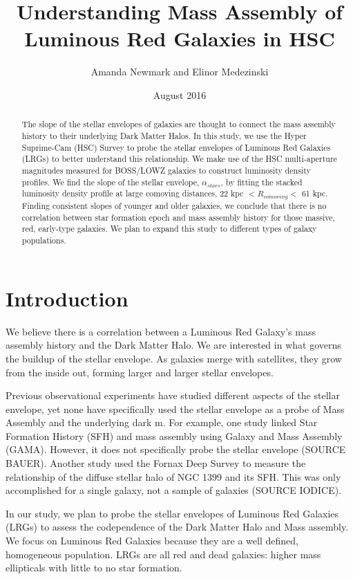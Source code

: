 \documentclass{article}
\title{Understanding Mass Assembly of Luminous Red Galaxies in HSC}
\author{Amanda Newmark and Elinor Medezinski}
\date{August 2016}
\begin{document}
\begin{titlepage}
\maketitle
\end{titlepage}

\begin{abstract}
The slope of the stellar envelopes of galaxies are thought to connect the mass assembly history to their underlying Dark Matter Halos. In this study, we use the Hyper Suprime-Cam (HSC) Survey to probe the stellar envelopes of Luminous Red Galaxies (LRGs) to better understand this relationship. We make use of the HSC multi-aperture magnitudes measured for BOSS/LOWZ galaxies to construct luminosity density profiles. We find the slope of the stellar envelope, $\alpha_{stars}$, by fitting the stacked luminosity density profile at large comoving distances, 22 kpc $< R_{comoving} <$ 61 kpc. Finding consistent slopes of younger and older galaxies, we conclude that there is no correlation between star formation epoch and mass assembly history for those massive, red, early-type galaxies. We plan to expand this study to different types of galaxy populations.
\end{abstract}
\tableofcontents{}

\clearpage
\section{Introduction}
We believe there is a correlation between a Luminous Red Galaxy's mass assembly history and the Dark Matter Halo. We are interested in what governs the buildup of the stellar envelope. As galaxies merge with satellites, they grow from the inside out, forming larger and larger stellar envelopes.

Previous observational experiments have studied different aspects of the stellar envelope, yet none have specifically used the stellar envelope as a probe of Mass Assembly and the underlying dark m. For example, one study linked Star Formation History (SFH) and mass assembly using Galaxy and Mass Assembly (GAMA). However, it does not specifically probe the stellar envelope (SOURCE BAUER). Another study used the Fornax Deep Survey to measure the relationship of the diffuse stellar halo of NGC 1399 and its SFH. This was only accomplished for a single galaxy, not a sample of galaxies (SOURCE IODICE).

In our study, we plan to probe the stellar envelopes of Luminous Red Galaxies (LRGs) to assess the codependence of the Dark Matter Halo and Mass assembly. We focus on Luminous Red Galaxies because they are a well defined, homogeneous population. LRGs are all red and dead galaxies: higher mass ellipticals with little to no star formation.
\end{document}
